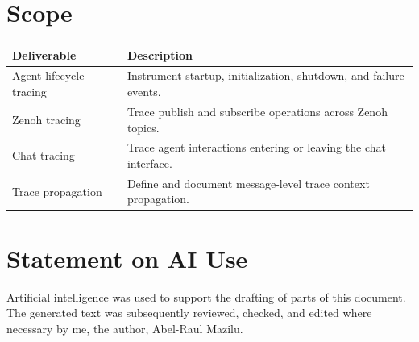 \documentclass[11pt]{article}
\begin{document}
\section{Scope}

\begin{table}[ht]
\centering
\renewcommand{\arraystretch}{1.25}
\begin{tabular}{L{0.32\textwidth} L{0.58\textwidth}}
\toprule
\textbf{Deliverable} & \textbf{Description} \\
\midrule
Agent lifecycle tracing & Instrument startup, initialization, shutdown, and failure events. \\
Zenoh tracing & Trace publish and subscribe operations across Zenoh topics. \\
Chat tracing & Trace agent interactions entering or leaving the chat interface. \\
Trace propagation & Define and document message-level trace context propagation. \\
\bottomrule
\end{tabular}
\end{table}


\newpage

\section*{Statement on AI Use}

Artificial intelligence was used to support the drafting of parts of this document. The generated text was subsequently reviewed, checked, and edited where necessary by me, the author, Abel-Raul Mazilu.
\end{document}

